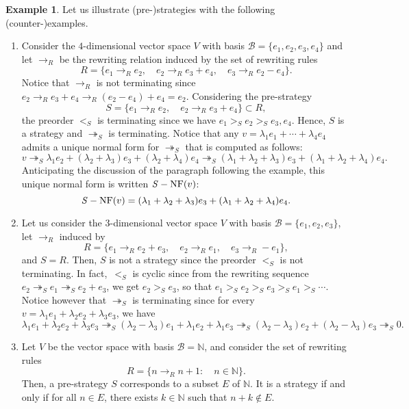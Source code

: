 \documentclass[11pt]{article}
\theoremstyle{definition}
\newtheorem{example}[theorem]{Example}
\newcommand\basis{\mathscr{B}}
\newcommand\ordS{<_S}
\newcommand\N{\mathbb{N}}
\newcommand\rewR{\to_R}
\newcommand\parS{\twoheadrightarrow_S}
\DeclareMathOperator{\SNF}{{\it S}-NF}
\begin{document}
\begin{example}\label{ex:strategies_step_1}
  Let us illustrate (pre-)strategies with the following
  (counter-)examples.
  \begin{enumerate}
  \item\label{it:ex_strat_1} Consider the $4$-dimensional vector space
    $V$ with basis $\basis=\{e_1,e_2,e_3,e_4\}$ and let $\rewR$ be the
    rewriting relation induced by the set of rewriting rules
    \[R=\{e_1\rewR e_2,\quad e_2\rewR e_3+e_4,\quad e_3\rewR e_2-e_4\}.\]
    Notice that $\rewR$ is not terminating since
    $e_2\rewR e_3+e_4\rewR(e_2-e_4)+e_4=e_2$. Considering the
    pre-strategy
    \[S=\{e_1\rewR e_2,\quad e_2\rewR e_3+e_4\}\subset R,\]
    the preorder $\ordS$ is terminating since we have
    $e_1>_Se_2>_Se_3,e_4$. Hence, $S$ is a strategy and $\parS$ is
    terminating. Notice that any $v=\lambda_1e_1+\cdots+\lambda_4e_4$ 
    admits a unique normal form for $\parS$ that is computed as follows:
    \[v\parS\lambda_1e_2+(\lambda_2+\lambda_3)e_3+
    (\lambda_2+\lambda_4)e_4\parS(\lambda_1+\lambda_2+\lambda_3)e_3+
    (\lambda_1+\lambda_2+\lambda_4)e_4.\]
    Anticipating the discussion of the paragraph following the example,
    this unique normal form is written $\SNF(v)$:
    \[\SNF(v)=(\lambda_1+\lambda_2+\lambda_3)e_3+
    (\lambda_1+\lambda_2+\lambda_4)e_4.\]
  \item\label{it:c-ex_strat_1} Let us consider the $3$-dimensional vector
    space $V$ with basis $\basis=\{e_1,e_2,e_3\}$, let $\rewR$ induced by
    \[R=\{e_1\rewR e_2+e_3,\quad e_2\rewR e_1,\quad e_3\rewR -e_1\},\]
    and $S=R$. Then, $S$ is not a strategy since the preorder $\ordS$ is
    not terminating. In fact,~$\ordS$ is cyclic since from the rewriting
    sequence $e_2\parS e_1\parS e_2+e_3$, we get $e_2>_Se_3$, so that
    $e_1>_S e_2>_S e_3>_S e_1>_S\cdots$. Notice however that $\parS$ is
    terminating since for every
    $v=\lambda_1e_1+\lambda_2e_2+\lambda_3e_3$, we have
    \[\lambda_1e_1+\lambda_2e_2+\lambda_3e_3\parS(\lambda_2-\lambda_3)e_1
    +\lambda_1e_2+\lambda_1e_3\parS(\lambda_2-\lambda_3)e_2+(\lambda_2-
    \lambda_3)e_3\parS 0.
    \]
  \item\label{it:case_N} Let $V$ be the vector space with basis
    $\basis= \mathbb N$, and consider the set of rewriting rules
    \[R=\{n\rewR n+1:\quad n\in\N\}.\]
    Then, a pre-strategy $S$ corresponds to a subset $E$ of $\mathbb N$.
    It is a strategy if and only if for all $n \in E$, there exists
    $k \in \mathbb N$ such that $n + k \notin E$. 
  \end{enumerate}
\end{example}
\smallskip
\end{document}
